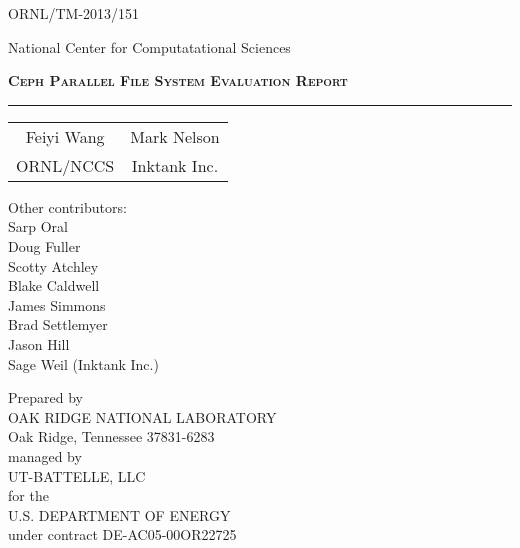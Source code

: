\thispagestyle{empty}

\hfill ORNL/TM-2013/151


\vspace{3em}

\begin{center}
National Center for Computatational Sciences
\end{center}


\vspace{3em}

\begin{center}
\textbf\textsc{\Large Ceph Parallel File System Evaluation Report}\\
\rule{5in}{1pt}%
\end{center}

\vspace{0.5in}

\begin{center}
\begin{tabular}{ c c }
Feiyi Wang  &  Mark Nelson \\ 
ORNL/NCCS & Inktank Inc. \\
\end{tabular}
\end{center}

\vspace{0.25in}

\begin{center}
Other contributors: \\
\vspace{1em}
Sarp Oral\\
Doug Fuller\\
Scotty Atchley\\
Blake Caldwell\\
James Simmons\\
Brad Settlemyer\\
Jason Hill\\
Sage Weil (Inktank Inc.)
\end{center}


\vfill

\begin{center}
Prepared by \\
OAK RIDGE NATIONAL LABORATORY\\
Oak Ridge, Tennessee 37831-6283 \\ 
managed by \\
UT-BATTELLE, LLC \\
for the \\
U.S. DEPARTMENT OF ENERGY\\ 
under contract DE-AC05-00OR22725
\end{center}

\pagebreak
